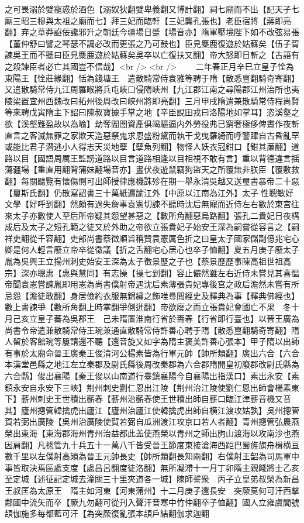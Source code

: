 之可畏溺於嬖寵惑於酒色【溺奴狄翻嬖卑義翻又博計翻】祠七廟而不出【記天子七廟三昭三穆與太祖之廟而七】拜三妃而臨軒【三妃龔孔張也】老臣宿將【蔣即亮翻】弃之草莽諂佞讒邪升之朝廷今疆場日蹙【場音亦】隋軍壓境陛下如不改弦易張【董仲舒曰譬之琴瑟不調必改而更張之乃可鼓也】臣見麋鹿復遊於姑蘇矣【伍子胥諫吳王而不聽曰臣見麋鹿遊於姑蘇矣吳卒以亡復扶又翻】帝大怒即日斬之【古語有之殺諫臣者必亡其國豈不信哉】<br />
<br />
　　二年春正月辛巳立皇子恮為東陽王【恮莊緣翻】恬為錢塘王　遣散騎常侍袁雅等聘于隋【散悉亶翻騎奇寄翻】又遣散騎常侍九江周羅㬋將兵屯峽口侵隋峽州【九江郡江南之尋陽郡江州治所也夷陵梁置宜州西魏改曰拓州後周改曰峽州將即亮翻】三月甲戌隋遣兼散騎常侍程尚賢等來聘戊寅隋主下詔曰陳叔寶據手掌之地【辛臣說田戎曰洛陽地如掌耳】恣溪壑之欲【溪壑難盈故以為喻】劫奪閻閭資產俱竭驅逼内外勞役弗已窮奢極侈俾晝作夜斬直言之客滅無罪之家欺天造惡祭鬼求恩盛粉黛而執干戈曳羅綺而呼警蹕自古昏亂罕或能比君子潜逃小人得志天災地孽【孽魚列翻】物怪人妖衣冠鉗口【鉗其亷翻】道路以目【國語周厲王監謗道路以目言道路相逢以目相視不敢有言】重以背德違言揺蕩疆場【重直用翻背蒲妹翻場音亦】晝伏夜遊鼠竊狗盜天之所覆無非朕臣【覆敷救翻】每關聽覽有懷傷惻可出師授律應機誅殄在期一舉永清吳越又送璽書暴帝二十惡【璽斯氏翻】仍散寫詔書三十萬紙遍諭江外【中原以江南為江外】太子性聰敏好文學【好呼到翻】然頗有過失詹事袁憲切諫不聽時沈后無寵而近侍左右數於東宫往來太子亦數使人至后所帝疑其怨望甚惡之【數所角翻惡烏路翻】張孔二貴妃日夜構成后及太子之短孔範之徒又於外助之帝欲立張貴妃子始安王深為嗣嘗從容言之【嗣祥吏翻從千容翻】吏部尚書蔡徵順旨稱贊袁憲厲色折之曰皇太子國家儲副億兆宅心卿是何人輕言廢立帝卒從徵議【折之舌翻宅心居心也卒子恤翻】夏五月庚子廢太子胤為吳興王立揚州刺史始安王深為太子徵景歷之子也【蔡景歷歷事陳高祖世祖高宗】深亦聰惠【惠與慧同】有志操【操七到翻】容止儼然雖左右近侍未嘗見其喜愠帝聞袁憲嘗諫胤即用憲為尚書僕射帝遇沈后素薄張貴妃專後宫之政后澹然未嘗有所忌怨【澹徒敢翻】身居儉約衣服無錦繡之飾唯尋閲經史及釋典為事【釋典佛經也】數上書諫爭【數所角翻上時掌翻爭側迸翻】帝欲廢之而立張貴妃會國亡不果　冬十月己亥立皇子蕃為吳郡王　己未隋置淮南行省於夀春【行省即行臺也】以晉王廣為尚書令帝遣兼散騎常侍王琬兼通直散騎常侍許善心聘于隋【散悉亶翻騎奇寄翻】隋人留於客館琬等屢請還不聽【還音旋又如字為隋主褒美許善心張本】甲子隋以出師有事於太廟命晉王廣秦王俊清河公楊素皆為行軍元帥【帥所類翻】廣出六合【六合本漢堂邑縣之地江左立秦郡及尉氏縣後周改秦郡為六合郡隋開皇初廢郡改尉氏縣為六合縣】俊出襄陽【秦王俊以山南道行臺鎮襄陽今自襄陽出指漢口】素出永安【素鎮永安自永安下三峽】荆州刺史劉仁恩出江陵【荆州治江陵使劉仁恩出師會楊素東下】蘄州刺史王世積出蘄春【蘄州治蘄春使王世積出師自蘄口臨江津蘄音機又音其】廬州摠管韓擒虎出廬江【廬州治廬江使韓擒虎出師自横江渡攻姑孰】吳州摠管賀若弼出廣陵【吳州治廣陵使賀若弼自瓜洲渡江攻京口若人者翻】青州摠管弘農燕榮出東海【東海郡海州青州治益都此盖使燕榮以青州之師出朐山渡海以攻南沙也燕因肩翻】凡摠管九十兵五十一萬八千皆受晉王節度東接滄海西距巴蜀旌旗舟楫横亘數千里以左僕射高熲為晉王元帥長史【帥所類翻長知兩翻】右僕射王韶為司馬軍中事皆取決焉區處支度【處昌呂翻度徒洛翻】無所凝滯十一月丁卯隋主親餞將士乙亥至定城【述征記定城去潼關三十里夾道各一城】陳師誓衆　丙子立皇弟叔榮為新昌王叔匡為太原王　隋主如河東【河東蒲州】十二月庚子還長安　突厥莫何可汗西擊鄰國中流矢而卒【厥九勿翻可從刋入聲汗音寒中竹仲翻卒子恤翻】國人立雍虞閭號頡伽施多每都藍可汗【為突厥復亂張本頡戶結翻伽求迦翻